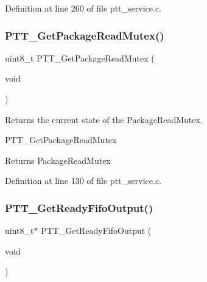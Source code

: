 Definition at line 260 of file ptt\+\_\+service.\+c.

\mbox{\label{group___p_t_t___service_gad597123d8ce8bd52a4eab91dbd5023f7}} 
\subsubsection{\texorpdfstring{P\+T\+T\+\_\+\+Get\+Package\+Read\+Mutex()}{PTT\_GetPackageReadMutex()}}
{\footnotesize\ttfamily uint8\+\_\+t P\+T\+T\+\_\+\+Get\+Package\+Read\+Mutex (\begin{DoxyParamCaption}\item[{void}]{ }\end{DoxyParamCaption})}



Returns the current state of the Package\+Read\+Mutex. 

P\+T\+T\+\_\+\+Get\+Package\+Read\+Mutex

\begin{DoxyReturn}{Returns}
Package\+Read\+Mutex 
\end{DoxyReturn}


Definition at line 130 of file ptt\+\_\+service.\+c.

\mbox{\label{group___p_t_t___service_gad621e3cbcce8a429cbb830ccd3bcd95f}} 
\subsubsection{\texorpdfstring{P\+T\+T\+\_\+\+Get\+Ready\+Fifo\+Output()}{PTT\_GetReadyFifoOutput()}}
{\footnotesize\ttfamily uint8\+\_\+t$\ast$ P\+T\+T\+\_\+\+Get\+Ready\+Fifo\+Output (\begin{DoxyParamCaption}\item[{void}]{ }\end{DoxyParamCaption})}



